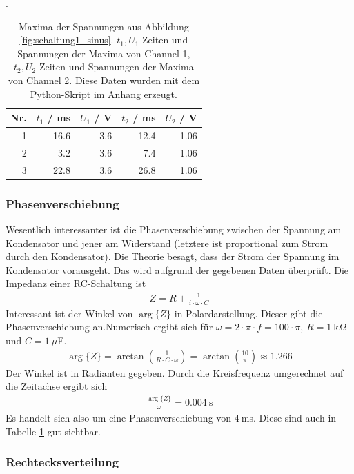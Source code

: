 \documentclass{article}
\begin{document}
\begin{table}[H]
\caption{Maxima der Spannungen aus Abbildung \ref{fig:schaltung1_sinus}. $t_1, U_1$ Zeiten und Spannungen der Maxima von Channel 1, $t_2, U_2$ Zeiten und Spannungen der Maxima von Channel 2. Diese Daten wurden mit dem Python-Skript im Anhang erzeugt.}.
\label{tab:minmax}
\begin{tabular}{r|rr|rr}
Nr. & $t_1$ / ms & $U_1$ / V & $t_2$ / ms & $U_2$ / V \\
\hline
1 & -16.6 & 3.6 & -12.4 & 1.06\\
2 & 3.2 & 3.6  & 7.4 & 1.06\\
3 & 22.8 & 3.6 & 26.8 & 1.06
\end{tabular}
\end{table}



\subsubsection{Phasenverschiebung}

Wesentlich interessanter ist die Phasenverschiebung zwischen der Spannung am Kondensator und jener am Widerstand (letztere ist proportional zum Strom durch den Kondensator). Die Theorie besagt, dass der Strom der Spannung im Kondensator vorausgeht. Das wird aufgrund der gegebenen Daten überprüft. Die Impedanz einer RC-Schaltung ist
\begin{align*}
Z = R + \frac{1}{i\cdot \omega\cdot C}
\end{align*}
Interessant ist der Winkel von $\operatorname{arg}\{Z\}$ in Polardarstellung. Dieser gibt die Phasenverschiebung an.Numerisch ergibt sich für $\omega = 2\cdot\pi\cdot f = 100\cdot \pi$, $R=1~$k$\Omega$ und $C=1~\mu$F.
\begin{align*}
\operatorname{arg}\{Z\} = \operatorname{arctan}\left(\frac{1}{R\cdot C\cdot \omega}\right) = \operatorname{arctan}\left( \frac{10}{\pi}\right) \approx 1.266
\end{align*}
Der Winkel ist in Radianten gegeben. Durch die Kreisfrequenz umgerechnet auf die Zeitachse ergibt sich
\begin{align*}
\frac{\operatorname{arg}\{Z\}}{\omega} = 0.004~\text{s}
\end{align*}
Es handelt sich also um eine Phasenverschiebung von $4~$ms. Diese sind auch in Tabelle \ref{tab:minmax} gut sichtbar.





\subsubsection{Rechtecksverteilung}
\end{document}
